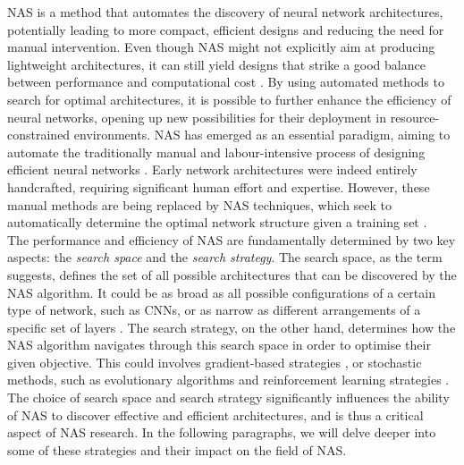 \acf{NAS} is a method that automates the discovery of neural network
architectures, potentially leading to more compact, efficient designs and
reducing the need for manual intervention. Even though \ac{NAS} might not
explicitly aim at producing lightweight architectures, it can still yield
designs that strike a good balance between performance and computational cost
\cite{DBLP:conf/cvpr/TanCPVSHL19,DBLP:conf/icml/TanL19}. By using automated
methods to search for optimal architectures, it is possible to further enhance
the efficiency of neural networks, opening up new possibilities for their
deployment in resource-constrained environments. \ac{NAS} has emerged as an
essential paradigm, aiming to automate the traditionally manual and
labour-intensive process of designing efficient neural networks
\cite{DBLP:journals/corr/MiikkulainenLMR17}. Early network architectures were
indeed entirely handcrafted, requiring significant human effort and expertise.
However, these manual methods are being replaced by \ac{NAS} techniques, which
seek to automatically determine the optimal network structure given a training
set \cite{DBLP:journals/corr/abs-2301-08727,elsken2019neural}.\\

The performance and efficiency of \ac{NAS} are fundamentally determined by two
key aspects: the \emph{search space} and the \emph{search strategy}. The search
space, as the term suggests, defines the set of all possible architectures that
can be discovered by the \ac{NAS} algorithm. It could be as broad as all
possible configurations of a certain type of network, such as \acp{CNN}, or as
narrow as different arrangements of a specific set of layers
\cite{DBLP:conf/cvpr/LiuCSAHY019}. The search strategy, on the other hand,
determines how the \ac{NAS} algorithm navigates through this search space in
order to optimise their given objective. This could involves gradient-based
strategies \cite{DBLP:conf/iclr/LiuSY19,DBLP:conf/iclr/XuX0CQ0X20}, or
stochastic methods, such as evolutionary algorithms and reinforcement learning
strategies \cite{DBLP:conf/iclr/ZophL17,DBLP:conf/icml/RealMSSSTLK17}. The
choice of search space and search strategy significantly influences the ability
of \ac{NAS} to discover effective and efficient architectures, and is thus a
critical aspect of NAS research. In the following paragraphs, we will delve
deeper into some of these strategies and their impact on the field of
\ac{NAS}.\\



